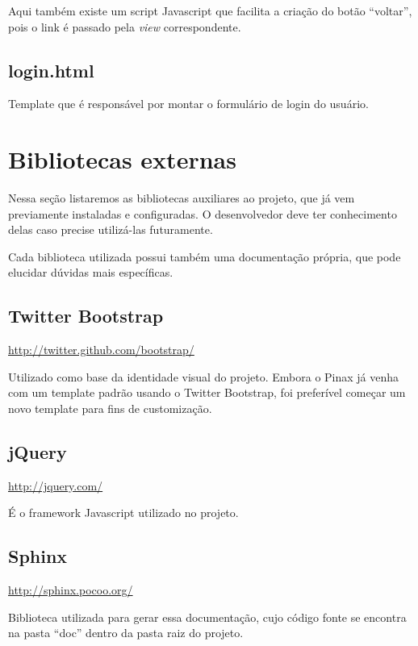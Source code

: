 \documentclass[letterpaper,10pt,brazil]{sphinxmanual}
\begin{document}
Aqui também existe um script Javascript que facilita a criação do botão ``voltar'', pois o link é passado pela \emph{view} correspondente.


\subsection{login.html}
\label{templates:login-html}
Template que é responsável por montar o formulário de login do usuário.


\section{Bibliotecas externas}
\label{bibliotecas:bibliotecas-externas}\label{bibliotecas::doc}
Nessa seção listaremos as bibliotecas auxiliares ao projeto, que já vem previamente instaladas e configuradas. O desenvolvedor deve ter conhecimento delas caso precise utilizá-las futuramente.

Cada biblioteca utilizada possui também uma documentação própria, que pode elucidar dúvidas mais específicas.


\subsection{Twitter Bootstrap}
\label{bibliotecas:twitter-bootstrap}
\href{http://twitter.github.com/bootstrap/}{http://twitter.github.com/bootstrap/}

Utilizado como base da identidade visual do projeto. Embora o Pinax já venha com um template padrão usando o Twitter Bootstrap, foi preferível começar um novo template para fins de customização.


\subsection{jQuery}
\label{bibliotecas:jquery}
\href{http://jquery.com/}{http://jquery.com/}

É o framework Javascript utilizado no projeto.


\subsection{Sphinx}
\label{bibliotecas:sphinx}
\href{http://sphinx.pocoo.org/}{http://sphinx.pocoo.org/}

Biblioteca utilizada para gerar essa documentação, cujo código fonte se encontra na pasta ``doc'' dentro da pasta raiz do projeto.
\end{document}
